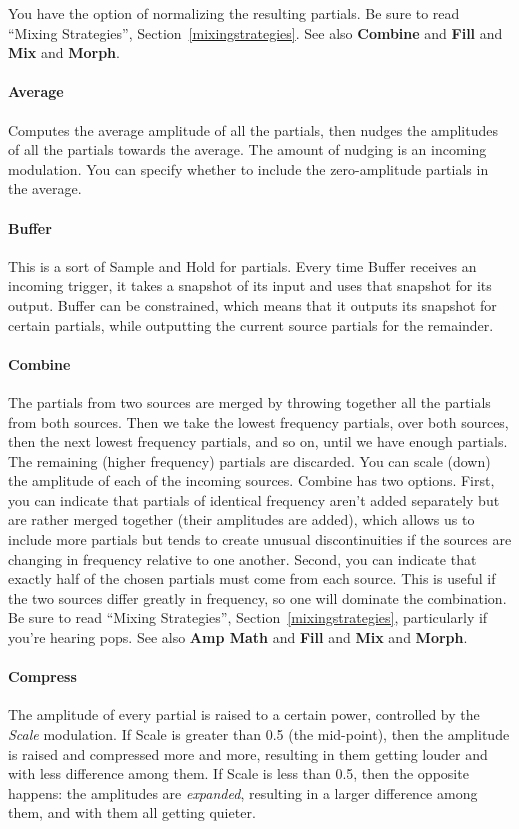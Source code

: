 \documentclass{article}
\begin{document}
You have the option of normalizing the resulting partials.   Be sure to read ``Mixing Strategies'', Section~\ref{mixingstrategies}.  See also {\bf Combine} and {\bf Fill} and {\bf Mix} and {\bf Morph}.

\paragraph{Average}  Computes the average amplitude of all the partials, then nudges the amplitudes of all the partials towards the average.  The amount of nudging is an incoming modulation.  You can specify whether to include the zero-amplitude partials in the average.

\paragraph{Buffer}  This is a sort of Sample and Hold for partials.  Every time Buffer receives an incoming trigger, it takes a snapshot of its input and uses that snapshot for its output.  Buffer can be constrained, which means that it outputs its snapshot for certain partials, while outputting the current source partials for the remainder.

\paragraph{Combine} The partials from two sources are merged by throwing together all the partials from both sources.  Then we take the lowest frequency partials, over both sources, then the next lowest frequency partials, and so on, until we have enough partials.  The remaining (higher frequency) partials are discarded.  You can scale (down) the amplitude of each of the incoming sources.  Combine has two options.  First, you can indicate that partials of identical frequency aren't added separately but are rather merged together (their amplitudes are added), which allows us to include more partials but tends to create unusual discontinuities if the sources are changing in frequency relative to one another.  Second, you can indicate that exactly half of the chosen partials must come from each source.  This is useful if the two sources differ greatly in frequency, so one will dominate the combination.  Be sure to read ``Mixing Strategies'', Section~\ref{mixingstrategies}, particularly if you're hearing pops.  See also {\bf Amp Math} and {\bf Fill} and {\bf Mix} and {\bf Morph}.

\paragraph{Compress}  The amplitude of every partial is raised to a certain power, controlled by the {\it Scale} modulation.  If Scale is greater than 0.5 (the mid-point), then the amplitude is raised and compressed more and more, resulting in them getting louder and with less difference among them.  If Scale is less than 0.5, then the opposite happens: the amplitudes are {\it expanded}, resulting in a larger difference among them, and with them all getting quieter.
\end{document}
